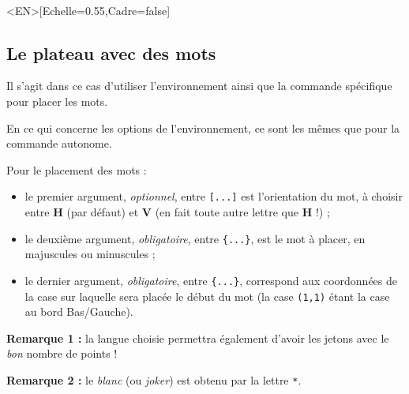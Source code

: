 \documentclass{article}
\newcommand\Cle[1]{{\bfseries\sffamily\textlangle #1\textrangle}}
\begin{document}
\begin{PresentationCode}{}
\PlateauScrabble[Labels=false,Echelle=0.55]\\     %
\PlateauScrabble<EN>[Echelle=0.55,Cadre=false]    %
\end{PresentationCode}

\newpage

\subsection{Le plateau avec des mots}

Il s'agit dans ce cas d'utiliser l'\textsf{environnement} ainsi que la \textsf{commande} spécifique pour placer les mots.

\smallskip

En ce qui concerne les options de l'\textsf{environnement}, ce sont les mêmes que pour la \textsf{commande} autonome.

\smallskip

Pour le placement des mots :

\begin{itemize}
	\item le premier argument, \textit{optionnel}, entre \texttt{[...]} est l'orientation du mot, à choisir entre \Cle{H} (par défaut) et \Cle{V} (en fait toute autre lettre que \Cle{H} !) ;
	\item le deuxième argument, \textit{obligatoire}, entre \texttt{\{...\}}, est le mot à placer, en majuscules ou minuscules ;
	\item le dernier argument, \textit{obligatoire}, entre \texttt{\{...\}}, correspond aux coordonnées de la case sur laquelle sera placée le début du mot (la case \texttt{(1,1)} étant la case au bord Bas/Gauche).
\end{itemize}

\textbf{Remarque 1 :} la langue choisie permettra également d'avoir les jetons avec le \textit{bon} nombre de points !

\smallskip

\textbf{Remarque 2 :} le \textit{blanc} (ou \textit{joker}) est obtenu par la lettre \texttt{*}.

\begin{PresentationCode}{}
\begin{EnvScrabbleFR}[Echelle=0.75,Labels=false,Aide]
\end{EnvScrabbleFR}
\end{PresentationCode}
\end{document}
